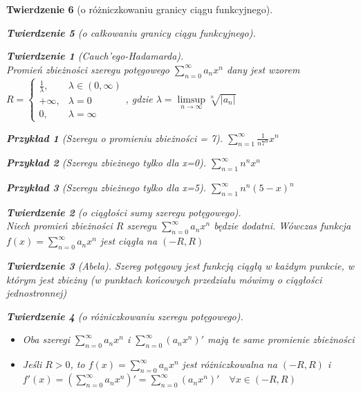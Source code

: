 \documentclass[12pt,a4paper]{article}
\newtheorem{tw}{Twierdzenie}
\newtheorem{przyklad}{Przykład}
\theoremstyle{definition}
\begin{document}
\begin{tw}[o różniczkowaniu granicy ciągu funkcyjnego]
\begin{tw}[o całkowaniu granicy ciągu funkcyjnego]
\begin{tw}[Cauch'ego-Hadamarda]~\\
Promień zbieżności szeregu potęgowego $\sum\limits_{n=0}^\infty a_nx^n$ dany jest wzorem 
$ R = 
	\begin{cases}
		\frac{1}{\lambda}, & \lambda \in (0,\infty)\\
		+\infty, & \lambda = 0\\
		0, & \lambda = \infty
	\end{cases} $, gdzie $\lambda = \limsup\limits_{n\to\infty}\sqrt[n]{|a_n|}$
\end{tw}

\begin{przyklad}[Szeregu o promieniu zbieżności = 7]
$\sum\limits_{n=1}^\infty \frac{1}{n7^n}x^n$
\end{przyklad}
\begin{przyklad}[Szeregu zbieżnego tylko dla x=0]
$\sum\limits_{n=1}^\infty n^nx^n$
\end{przyklad}
\begin{przyklad}[Szeregu zbieżnego tylko dla x=5]
$\sum\limits_{n=1}^\infty n^n(5-x)^n$
\end{przyklad}

\begin{tw}[o ciągłości sumy szeregu potęgowego]~\\
Niech promień zbieżności $R$ szeregu $\sum\limits_{n=0}^\infty a_nx^n$ będzie dodatni. Wówczas funkcja $f(x)=\sum\limits_{n=0}^\infty a_nx^n$ jest ciągła na $(-R, R)$
\end{tw}

\begin{tw}[Abela]
Szereg potęgowy jest funkcją ciągłą w każdym punkcie, w którym jest zbieżny (w punktach końcowych przedziału mówimy o ciągłości jednostronnej) 
\end{tw}

\begin{tw}[o różniczkowaniu szeregu potęgowego]~\\
\begin{itemize}
	\item Oba szeregi $\sum\limits_{n=0}^\infty a_nx^n$ i $\sum\limits_{n=0}^\infty (a_nx^n)'$ mają te same promienie zbieżności
	\item Jeśli $R > 0$, to $f(x) = \sum\limits_{n=0}^\infty a_nx^n$ jest różniczkowalna na $(-R, R)$ i $f'(x) = (\sum\limits_{n=0}^\infty a_nx^n)' = \sum\limits_{n=0}^\infty (a_nx^n)' \quad \forall x\in (-R,R)$
\end{itemize}
\end{tw}


\end{tw}
\end{tw}
\end{document}
